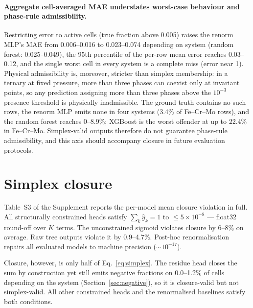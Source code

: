 \documentclass[preprint,12pt,authoryear]{elsarticle}
\begin{document}
\paragraph{Aggregate cell-averaged MAE understates worst-case behaviour
and phase-rule admissibility.}
Restricting error to active cells (true fraction above 0.005) raises the
renorm MLP's MAE from 0.006--0.016 to 0.023--0.074 depending on system
(random forest: 0.025--0.049), the 95th percentile of the per-row mean
error reaches 0.03--0.12, and the single worst cell in every system is a
complete miss (error near 1). Physical admissibility is, moreover, stricter
than simplex membership: in a ternary at fixed pressure, more than three
phases can coexist only at invariant points, so any prediction assigning
more than three phases above the $10^{-3}$ presence threshold is physically
inadmissible. The ground truth contains no such rows, the renorm MLP emits
none in four systems (3.4\% of Fe--Cr--Mo rows), and the random forest
reaches 0--8.9\%; XGBoost is the worst offender at up to 22.4\% in
Fe--Cr--Mo. Simplex-valid outputs therefore do not guarantee phase-rule
admissibility, and this axis should accompany closure in future evaluation
protocols.

\section{Simplex closure}
\label{sec:closure}

Table~S3 of the Supplement reports the per-model mean closure violation
in full. All
structurally constrained heads satisfy $\sum_k \hat y_k = 1$ to
$\le 5\times10^{-8}$ --- float32 round-off over $K$ terms. The unconstrained
sigmoid violates closure by 6--8\% on average. Raw tree outputs violate it by
0.9--4.7\%. Post-hoc renormalisation repairs all evaluated models to machine precision
(${\sim}10^{-17}$).

Closure, however, is only half of Eq.~\eqref{eq:simplex}. The residue head
closes the sum by construction yet still emits negative fractions on
0.0--1.2\% of cells depending on the system (Section~\ref{sec:negative}),
so it is closure-valid but not simplex-valid. All other constrained heads
and the renormalised baselines satisfy both conditions.
\end{document}
